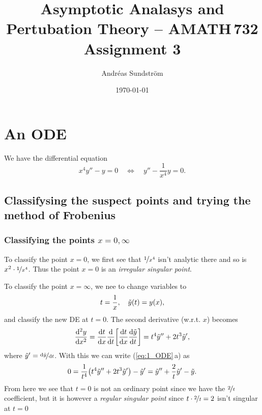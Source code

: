 \documentclass[11pt,letter, swedish, english
]{article}
\begin{document}
\title{Asymptotic Analasys and Pertubation Theory -- AMATH\,732 \\
Assignment 3}
\author{Andréas Sundström}
\date{\today}

\maketitle



\section{An ODE}
We have the differential equation
\begin{equation}\label{eq:1_ODE}
x^4y''-y=0
\quad\Longleftrightarrow\quad
y''-\frac{1}{x^4}y = 0.
\end{equation}

\subsection{Classifysing the suspect points 
  and trying the method of Frobenius} 

\subsubsection{Classifying the points $x=0, \infty$}
To classify the point $x=0$, we first see that $\nicefrac{1}{x^4}$
isn't analytic there and so is $x^2\cdot\nicefrac{1}{x^4}$. Thus the
point $x=0$ is an \emph{irregular singular point}.

To classify the point $x=\infty$, we nee to change variables to
\begin{equation}
t=\frac{1}{x}\qcomma \tilde{y}(t)=y(x),
\end{equation}
and classify the new DE at $t=0$.
The second derivative (w.r.t. $x$) becomes
\begin{equation}
\dv[2]{y}{x}=\dv{t}{x}
\dv{t}\qty[\dv{t}{x}\dv{\tilde{y}}{t}]=t^4\tilde{y}''+2t^3\tilde{y}',
\end{equation}
where $\tilde{y}'=\nicefrac{\mathrm{d}\tilde{y}}{\mathrm{d}{t}}$. With this we can
write (\ref{eq:1_ODE}\,a) as
\begin{equation}
0=\frac{1}{t^4}\qty(t^4\tilde{y}''+2t^3\tilde{y}') - \tilde{y} '
= \tilde{y}'' +\frac{2}{t}\tilde{y}' - \tilde{y}.
\end{equation}
From here we see that $t=0$ is not an ordinary point since we have the
$\nicefrac{2}{t}$ coefficient, but it is however a \emph{regular singular
point} since $t\cdot\nicefrac{2}{t}=2$ isn't singular at $t=0$
\end{document}
